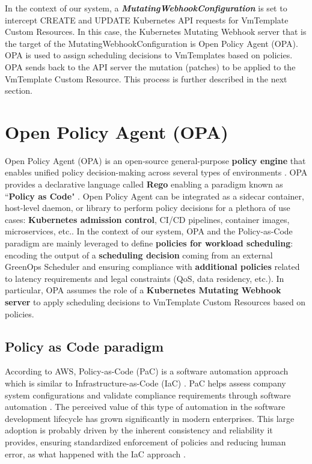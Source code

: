 In the context of our system, a \textbf{\textit{MutatingWebhookConfiguration}} is set to intercept CREATE and UPDATE Kubernetes API requests for VmTemplate Custom Resources.
In this case, the Kubernetes Mutating Webhook server that is the target of the MutatingWebhookConfiguration is Open Policy Agent (OPA).
OPA is used to assign scheduling decisions to VmTemplates based on policies. 
OPA sends back to the API server the mutation (patches) to be applied to the VmTemplate Custom Resource.
This process is further described in the next section.

\section{Open Policy Agent (OPA)}

Open Policy Agent (OPA) is an open-source general-purpose \textbf{policy engine} that enables unified policy decision-making across several types of environments \cite{opa_docs}. 
OPA provides a declarative language called \textbf{Rego} enabling a paradigm known as ``\textbf{Policy as Code}" \cite{opa_docs}.
Open Policy Agent can be integrated as a sidecar container, host-level daemon, or library to perform policy decisions for a plethora of use cases: \textbf{Kubernetes admission control}, CI/CD pipelines, container images, microservices, etc.\cite{opa_docs}. 
In the context of our system, OPA and the Policy-as-Code paradigm are mainly leveraged to define \textbf{policies for workload scheduling}: encoding the output of a \textbf{scheduling decision} coming from an external GreenOps Scheduler and ensuring compliance with \textbf{additional policies} related to latency requirements and legal constraints (QoS, data residency, etc.).
In particular, OPA assumes the role of a \textbf{Kubernetes Mutating Webhook server} to apply scheduling decisions to VmTemplate Custom Resources based on policies.

\subsection{Policy as Code paradigm}

According to AWS, Policy-as-Code (PaC) is a software automation approach which is similar to Infrastructure-as-Code (IaC) \cite{pac_aws}. 
PaC helps assess company system configurations and validate compliance requirements through software automation \cite{pac_aws}. 
The perceived value of this type of automation in the software development lifecycle has grown significantly in modern enterprises. 
This large adoption is probably driven by the inherent consistency and reliability it provides, ensuring standardized enforcement of policies and reducing human error, as what happened with the IaC approach \cite{pac_aws}.

